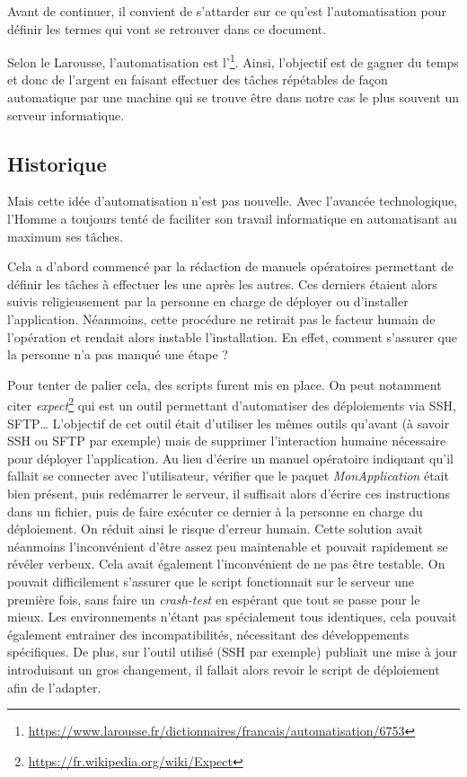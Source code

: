 Avant de continuer, il convient de s'attarder sur ce qu'est l'automatisation pour définir les termes qui vont se retrouver dans ce document.

Selon le Larousse, l'automatisation est l'\footnote{\url{https://www.larousse.fr/dictionnaires/francais/automatisation/6753}}. Ainsi, l'objectif est de gagner du temps et donc de l'argent en faisant effectuer des tâches répétables de façon automatique par une machine qui se trouve être dans notre cas le plus souvent un serveur informatique.

\subsection*{Historique}

Mais cette idée d'automatisation n'est pas nouvelle. Avec l'avancée technologique, l'Homme a toujours tenté de faciliter son travail informatique en automatisant au maximum ses tâches. 

Cela a d'abord commencé par la rédaction de manuels opératoires permettant de définir les tâches à effectuer les une après les autres. Ces derniers étaient alors suivis religieusement par la personne en charge de déployer ou d'installer l'application. Néanmoins, cette procédure ne retirait pas le facteur humain de l'opération et rendait alors instable l'installation. En effet, comment s'assurer que la personne n'a pas manqué une étape ? 

Pour tenter de palier cela, des scripts furent mis en place. On peut notamment citer \emph{expect}\footnote{\url{https://fr.wikipedia.org/wiki/Expect}} qui est un outil permettant d'automatiser des déploiements via \gls{SSH}, \gls{SFTP}\ldots{} L'objectif de cet outil était d'utiliser les mêmes outils qu'avant (à savoir \gls{SSH} ou \gls{SFTP} par exemple) mais de supprimer l'interaction humaine nécessaire pour déployer l'application. Au lieu d'écrire un manuel opératoire indiquant qu'il fallait se connecter avec l'utilisateur, vérifier que le paquet \emph{MonApplication} était bien présent, puis redémarrer le serveur, il suffisait alors d'écrire ces instructions dans un fichier, puis de faire exécuter ce dernier à la personne en charge du déploiement. On réduit ainsi le risque d'erreur humain. Cette solution avait néanmoins l'inconvénient d'être assez peu maintenable et pouvait rapidement se révéler verbeux. Cela avait également l'inconvénient de ne pas être testable. On pouvait difficilement s'assurer que le script fonctionnait sur le serveur une première fois, sans faire un \emph{crash-test} en espérant que tout se passe pour le mieux. Les environnements n'étant pas spécialement tous identiques, cela pouvait également entrainer des incompatibilités, nécessitant des développements spécifiques. De plus, sur l'outil utilisé (\gls{SSH} par exemple) publiait une mise à jour introduisant un gros changement, il fallait alors revoir le script de déploiement afin de l'adapter.

